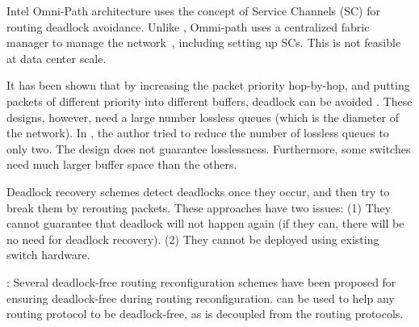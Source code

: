  Intel Omni-Path architecture \cite{omnipath} uses the
concept of Service Channels (SC) for routing deadlock avoidance.  Unlike
\sysname{}, Ommi-path uses a centralized fabric manager to manage the
network~\cite{omnipath}, including setting up SCs. This is not feasible at
data center scale.


 It has been shown that by
increasing the packet priority hop-by-hop, and putting packets of different
priority into different buffers, deadlock can be avoided
\cite{firstpaper,survey,datanetworks,karol2003prevention}. These designs,
however, need a large number lossless queues (which is the diameter of the
network). In \cite{dag}, the author tried to reduce the number of lossless
queues to only two. The design does not guarantee losslessness. Furthermore,
some switches need much larger buffer space than the others.

 Deadlock recovery schemes
\cite{isca95,shpiner2016unlocking,venkatramani1996,martinez1997,Lopez1998}
detect deadlocks once they occur, and then try to break them by rerouting
packets.  These approaches have two issues: (1) They cannot guarantee that
deadlock will not happen again (if they can, there will be no need for deadlock
recovery). (2) They cannot be deployed using existing switch hardware.



:
Several deadlock-free routing reconfiguration schemes
\cite{automatic,lysne2005,doublescheme,gara2005} have been proposed for
ensuring deadlock-free during routing reconfiguration. \sysname{} can
be used to help any routing protocol to be deadlock-free, as
\sysname{} is decoupled from the routing protocols.

